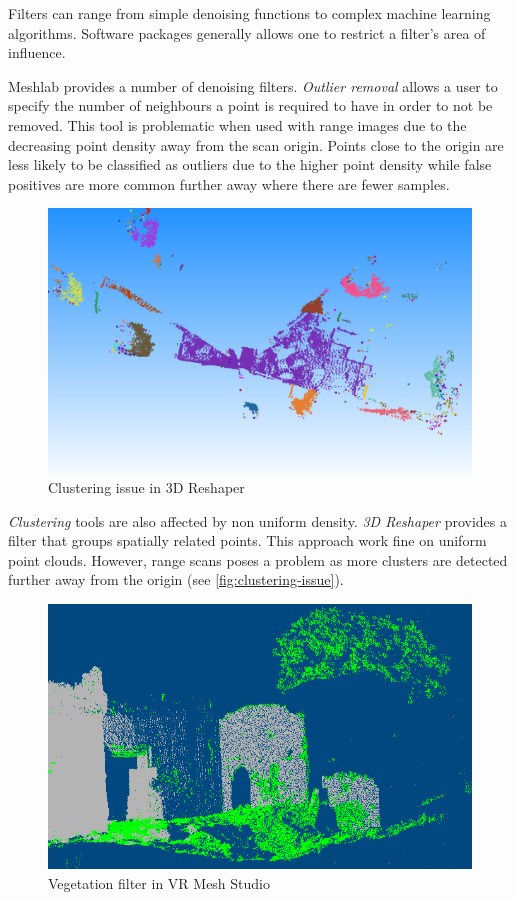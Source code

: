 Filters can range from simple denoising functions to complex machine learning algorithms. Software packages generally allows one to restrict a filter's area of influence.

Meshlab provides a number of denoising filters. \emph{Outlier removal} allows a user to specify the number of neighbours a point is required to have in order to not be removed. This tool is problematic when used with range images due to the decreasing point density away from the scan origin. Points close to the origin are less likely to be classified as outliers due to the higher point density while false positives are more common further away where there are fewer samples.

\begin{figure}[ht]
  \centering
  \includegraphics[width=1\linewidth]{images/clustering}
  \caption{Clustering issue in 3D Reshaper \cite{Technodigit2012}}
  \label{fig:clustering-issue}
\end{figure}

\emph{Clustering} tools are also affected by non uniform density. \emph{3D Reshaper} \cite{Technodigit2012} provides a filter that groups spatially related points. This approach work fine on uniform point clouds. However, range scans poses a problem as more clusters are detected further away from the origin (see \autoref{fig:clustering-issue}).

\begin{figure}[ht]
  \centering
  \includegraphics[width=1\linewidth]{images/vrmesh-veg}
  \caption{Vegetation filter in VR Mesh Studio \cite{VirtualGrid2012}}
  \label{fig:vegetation-issue}
\end{figure}


